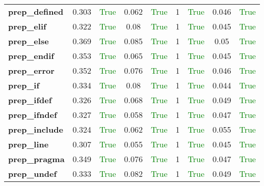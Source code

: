 \documentclass{article}
\begin{document}
\begin{xltabular}{\textwidth}{lcccccccc}
\textbf{{\fontsize{10}{12}\selectfont prep\_defined}}& 0.303&\textcolor{green}{True}& 0.062&\textcolor{green}{True}& 1&\textcolor{green}{True}& 0.046&\textcolor{green}{True} \\[0.5ex]
\textbf{{\fontsize{10}{12}\selectfont prep\_elif}}& 0.322&\textcolor{green}{True}& 0.08&\textcolor{green}{True}& 1&\textcolor{green}{True}& 0.045&\textcolor{green}{True} \\[0.5ex]
\textbf{{\fontsize{10}{12}\selectfont prep\_else}}& 0.369&\textcolor{green}{True}& 0.085&\textcolor{green}{True}& 1&\textcolor{green}{True}& 0.05&\textcolor{green}{True} \\[0.5ex]
\textbf{{\fontsize{10}{12}\selectfont prep\_endif}}& 0.353&\textcolor{green}{True}& 0.065&\textcolor{green}{True}& 1&\textcolor{green}{True}& 0.045&\textcolor{green}{True} \\[0.5ex]
\textbf{{\fontsize{10}{12}\selectfont prep\_error}}& 0.352&\textcolor{green}{True}& 0.076&\textcolor{green}{True}& 1&\textcolor{green}{True}& 0.046&\textcolor{green}{True} \\[0.5ex]
\textbf{{\fontsize{10}{12}\selectfont prep\_if}}& 0.334&\textcolor{green}{True}& 0.08&\textcolor{green}{True}& 1&\textcolor{green}{True}& 0.044&\textcolor{green}{True} \\[0.5ex]
\textbf{{\fontsize{10}{12}\selectfont prep\_ifdef}}& 0.326&\textcolor{green}{True}& 0.068&\textcolor{green}{True}& 1&\textcolor{green}{True}& 0.049&\textcolor{green}{True} \\[0.5ex]
\textbf{{\fontsize{10}{12}\selectfont prep\_ifndef}}& 0.327&\textcolor{green}{True}& 0.058&\textcolor{green}{True}& 1&\textcolor{green}{True}& 0.047&\textcolor{green}{True} \\[0.5ex]
\textbf{{\fontsize{10}{12}\selectfont prep\_include}}& 0.324&\textcolor{green}{True}& 0.062&\textcolor{green}{True}& 1&\textcolor{green}{True}& 0.055&\textcolor{green}{True} \\[0.5ex]
\textbf{{\fontsize{10}{12}\selectfont prep\_line}}& 0.307&\textcolor{green}{True}& 0.055&\textcolor{green}{True}& 1&\textcolor{green}{True}& 0.045&\textcolor{green}{True} \\[0.5ex]
\textbf{{\fontsize{10}{12}\selectfont prep\_pragma}}& 0.349&\textcolor{green}{True}& 0.076&\textcolor{green}{True}& 1&\textcolor{green}{True}& 0.047&\textcolor{green}{True} \\[0.5ex]
\textbf{{\fontsize{10}{12}\selectfont prep\_undef}}& 0.333&\textcolor{green}{True}& 0.082&\textcolor{green}{True}& 1&\textcolor{green}{True}& 0.049&\textcolor{green}{True} \\[0.5ex]

\end{xltabular}
\end{document}
